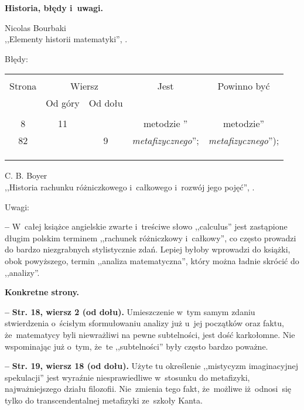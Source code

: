 \documentclass[a4paper,11pt]{article}
\newcommand{\Center}[1]{\begin{center} #1 \end{center}}
\newcommand{\tb}{\textbf}
\newcommand{\StrWd}[2]{\textbf{Str. #1, wiersz #2 (od dołu).}}
\newcommand{\noi}{\noindent}
\newcommand{\start}{\noi \tb{--} {}}
\newcommand{\Field}[1]{ \begin{center} {\Large \tb{#1} } \end{center} }
\newcommand{\Work}[1]{ \begin{center} {\large #1} \end{center} }
\begin{document}
\Field{Historia, błędy i~uwagi.}



\Work{
  Nicolas Bourbaki \\
  ,,Elementy historii matematyki'', \cite{NBEHM}. }

Błędy:\\
\begin{center}
  \begin{tabular}{|c|c|c|c|c|}
    \hline
    & \multicolumn{2}{c|}{} & & \\
    Strona & \multicolumn{2}{c|}{Wiersz}& Jest & Powinno być \\ \cline{2-3}
    & Od góry & Od dołu &  &  \\ \hline
    & & & & \\
    8 & 11 & & metodzie '' & metodzie'' \\
    82 & & 9 & \emph{metafizycznego}''; & \emph{metafizycznego}''); \\
    & & & & \\
    & & & & \\
    & & & & \\ \hline
  \end{tabular}
\end{center}


\Work{
  C. B. Boyer \\
  ,,Historia rachunku różniczkowego i~całkowego i~rozwój jego pojęć'',
  \cite{Boy64}. }


\Center{Uwagi:}

\start W~całej książce angielskie zwarte i~treściwe słowo ,,calculus''
jest zastąpione długim polskim terminem ,,rachunek różniczkowy
i~całkowy'', co często prowadzi do bardzo niezgrabnych stylistycznie
zdań. Lepiej byłoby wprowadzi do książki, obok powyższego, termin
,,analiza matematyczna'', który można ładnie skrócić do ,,analizy''.

\vspace{2em}

\noi \textbf{Konkretne strony.}

\start \StrWd{18}{2} Umieszczenie w~tym samym zdaniu stwierdzenia
o~ścisłym sformułowaniu analizy już u~jej początków oraz faktu,
że~matematycy byli niewrażliwi na pewne subtelności, jest dość
karkołomne. Nie wspominając już o~tym, że~te ,,subtelności'' były
często bardzo poważne.

\start \StrWd{19}{18} Użyte tu określenie ,,mistycyzm imaginacyjnej
spekulacji'' jest wyraźnie niesprawiedliwe w~stosunku do metafizyki,
najważniejszego działu filozofii. Nie~zmienia tego fakt, że~możliwe
iż~odnosi~się tylko do transcendentalnej metafizyki ze~szkoły Kanta.
\end{document}
